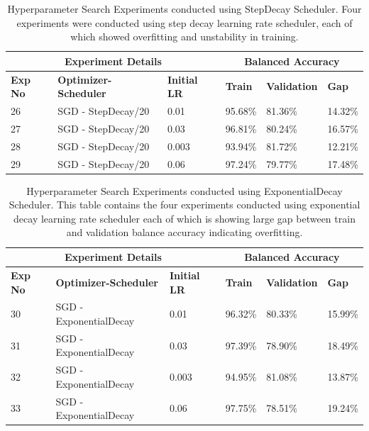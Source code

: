 \documentclass{report} %
\begin{document}
\begin{table}[]
\caption[Hyperparameter Search Experiments conducted using StepDecay Scheduler.]{Hyperparameter Search Experiments conducted using StepDecay Scheduler. Four experiments were conducted using step decay learning rate scheduler, each of which showed overfitting and unstability in training.}
\label{table:stepdecay-performance}
\begin{center}
\small
\begin{tabular}{llllll}
\multicolumn{3}{c}{\bf{Experiment Details}} & \multicolumn{3}{c}{\bf{Balanced Accuracy}} \\
\hline
\bf{Exp No} & \bf{Optimizer-Scheduler} & \bf{Initial LR} & \bf{Train} & \bf{Validation} & \bf{Gap} \\
\hline
26 & SGD - StepDecay/20 & 0.01 & 95.68\% & 81.36\% & 14.32\% \\
27 & SGD - StepDecay/20 & 0.03 & 96.81\% & 80.24\% & 16.57\% \\
28 & SGD - StepDecay/20 & 0.003 & 93.94\% & 81.72\% & 12.21\% \\
29 & SGD - StepDecay/20 & 0.06 & 97.24\% & 79.77\% & 17.48\% \\
\hline
\end{tabular}
\end{center}
\end{table}

\begin{table}[]
\caption[Hyperparameter Search Experiments conducted using ExponentialDecay Scheduler.]{Hyperparameter Search Experiments conducted using ExponentialDecay Scheduler. This table contains the four experiments conducted using exponential decay learning rate scheduler each of which is showing large gap between train and validation balance accuracy indicating overfitting.}
\label{table:exponentialdecay-performance}
\begin{center}
\small
\begin{tabular}{llllll}
\multicolumn{3}{c}{\bf{Experiment Details}} & \multicolumn{3}{c}{\bf{Balanced Accuracy}} \\
\hline
\bf{Exp No} & \bf{Optimizer-Scheduler} & \bf{Initial LR} & \bf{Train} & \bf{Validation} & \bf{Gap} \\
\hline
30 & SGD - ExponentialDecay & 0.01 & 96.32\% & 80.33\% & 15.99\% \\
31 & SGD - ExponentialDecay & 0.03 & 97.39\% & 78.90\% & 18.49\% \\
32 & SGD - ExponentialDecay & 0.003 & 94.95\% & 81.08\% & 13.87\% \\
33 & SGD - ExponentialDecay & 0.06 & 97.75\% & 78.51\% & 19.24\% \\
\hline
\end{tabular}
\end{center}
\end{table}
\end{document}

